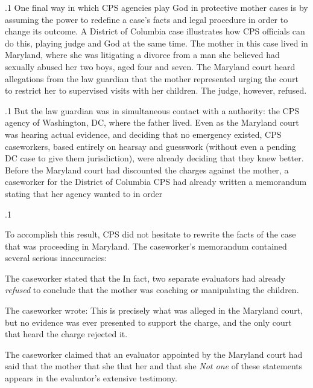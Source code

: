 \documentclass[11pt, twoside]{article}
\begin{document}
{{}%

\p.1{%
One final way in which CPS agencies play God in protective mother
cases is by assuming the power to redefine a case's facts and legal
procedure in order to change its outcome. A District of
Columbia case illustrates how CPS officials can do this,
playing judge and God at the same time. The mother in this case lived
in Maryland, where she was litigating a divorce from a man she believed
had sexually abused her two boys, aged four and seven. The Maryland
court heard  allegations from the law guardian that the
mother represented  urging the court to restrict her to supervised visits with her children. The
judge, however, refused.
}%

\p.1{%
But the law guardian was in simultaneous contact with a  authority: the CPS agency of Washington, DC, where the father lived. Even
as the Maryland court was hearing actual evidence, and deciding that
no emergency existed, CPS caseworkers, based entirely on hearsay and
guesswork (without even a pending DC case to give them jurisdiction),
were already deciding that they knew better.
Before the Maryland court had discounted the charges against the
mother, a caseworker for the District of Columbia CPS had already
written a memorandum stating that her agency wanted to  in order 
}%

\p.1{%
To accomplish this result, CPS did not hesitate to rewrite the facts of
the case that was proceeding in Maryland. The caseworker's
memorandum contained several serious inaccuracies:

\begin{itemz}

\symItem{}  The caseworker stated that the  In fact, two separate
evaluators had already \textit{refused} to conclude that the mother was
coaching or manipulating the children.
 
\symItem{}  The caseworker wrote:  This is
precisely what was alleged in the Maryland court, but no
evidence was ever presented to support the charge, and the only
court that heard the charge rejected it.

\symItem{}  The caseworker claimed that an evaluator appointed by the
Maryland court had said that the mother  that she  that her
 and that she  \textit{Not one} of these statements appears in the
evaluator's extensive testimony.


\end{itemz}}}
\end{document}
